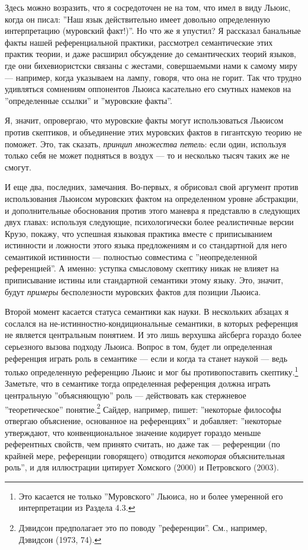 \documentclass[11pt]{book}
\begin{document}
Здесь можно возразить, что я сосредоточен не на том, что имел в виду Льюис, когда он писал: ''Наш язык действительно имеет довольно определенную интерпретацию (муровский факт!)''. Но что же я упустил? Я рассказал банальные факты нашей референциальной практики, рассмотрел семантические этих практик теории, и даже расширил обсуждение до семантических теорий языков, где они бихевиористски связаны с жестами, совершаемыми нами к самому миру --- например, когда указываем на лампу, говоря, что она не горит. Так что трудно удивляться сомнениям оппонентов Льюиса касательно его смутных намеков на ''определенные ссылки'' и ''муровские факты''.

Я, значит, опровергаю, что муровские факты могут использоваться Льюисом против скептиков, и объединение этих муровских фактов в гигантскую теорию не поможет. Это, так сказать, \textit{принцип множества петель}: если один, используя только себя не может подняться в воздух --- то и несколько тысяч таких же не смогут.

И еще два, последних, замечания. Во-первых, я обрисовал свой аргумент против использования Льюисом муровских фактом на определенном уровне абстракции, и дополнительные обоснования против этого маневра я представлю в следующих двух главах: используя следующие, психологически более реалистичные версии Крузо, покажу, что успешная языковая практика вместе с приписыванием истинности и ложности этого языка предложениям и со стандартной для него семантикой истинности --- полностью совместима с ''неопределенной референцией''. А именно: уступка смысловому скептику никак не влияет на приписывание истины или стандартной семантики этому языку. Это, значит, будут \textit{примеры} бесполезности муровских фактов для позиции Льюиса.

Второй момент касается статуса семантики как науки. В нескольких абзацах я сослался на не-истинностно-кондициональные семантики, в которых референция не является центральным понятием. И это лишь верхушка айсберга гораздо более серьезного вызова подходу Льюиса. Вопрос в том, будет ли определенная референция играть роль в семантике --- если и когда та станет наукой --- ведь только определенную референцию Льюис и мог бы противопоставить скептику.\footnote{Это касается не только ''Муровского'' Льюиса, но и более умеренной его интерпретации из Раздела 4.3.} Заметьте, что в семантике тогда определенная референция должна играть центральную ''объясняющую'' роль --- действовать как стержневое ''теоретическое'' понятие.\footnote{Дэвидсон предполагает это по поводу ''референции''. См., например, Дэвидсон (1973, 74).} Сайдер, например, пишет: ''некоторые философы отвергаю объяснение, основанное на референциях'' и добавляет: ''некоторые утверждают, что конвенциональное значение кодирует гораздо меньше референтных свойств, чем принято считать, но даже так --- референции (по крайней мере, референции говорящего) отводится \textit{некоторая} объяснительная роль'', и для иллюстрации цитирует Хомского (2000) и Петровского (2003).
\end{document}

